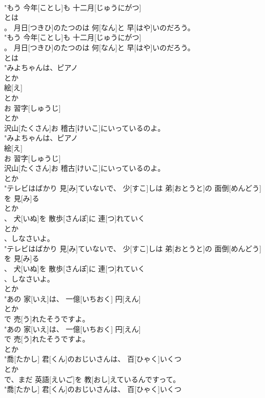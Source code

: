 \documentclass[8pt]{extreport}
\begin{document}
\begin{CJK}{UTF8}{min}
\\	"もう 今年[ことし]も 十二月[じゅうにがつ]
\\	とは
\\	。 月日[つきひ]のたつのは 何[なん]と 早[はや]いのだろう。
\\	"もう 今年[ことし]も 十二月[じゅうにがつ]
\\	。 月日[つきひ]のたつのは 何[なん]と 早[はや]いのだろう。
\\	とは
\\	"みよちゃんは、ピアノ
\\	とか
\\	絵[え]
\\	とか
\\	お 習字[しゅうじ]
\\	とか
\\	沢山[たくさん]お 稽古[けいこ]にいっているのよ。
\\	"みよちゃんは、ピアノ
\\	絵[え]
\\	お 習字[しゅうじ]
\\	沢山[たくさん]お 稽古[けいこ]にいっているのよ。
\\	とか
\\	"テレビはばかり 見[み]ていないで、 少[すこ]しは 弟[おとうと]の 面倒[めんどう]を 見[み]る
\\	とか
\\	、 犬[いぬ]を 散歩[さんぽ]に 連[つ]れていく
\\	とか
\\	、しなさいよ。
\\	"テレビはばかり 見[み]ていないで、 少[すこ]しは 弟[おとうと]の 面倒[めんどう]を 見[み]る
\\	、 犬[いぬ]を 散歩[さんぽ]に 連[つ]れていく
\\	、しなさいよ。
\\	とか
\\	"あの 家[いえ]は、 一億[いちおく] 円[えん]
\\	とか
\\	で 売[う]れたそうですよ。
\\	"あの 家[いえ]は、 一億[いちおく] 円[えん]
\\	で 売[う]れたそうですよ。
\\	とか
\\	"喬[たかし] 君[くん]のおじいさんは、 百[ひゃく]いくつ
\\	とか
\\	で、まだ 英語[えいご]を 教[おし]えているんですって。
\\	"喬[たかし] 君[くん]のおじいさんは、 百[ひゃく]いくつ

\end{CJK}
\end{document}
